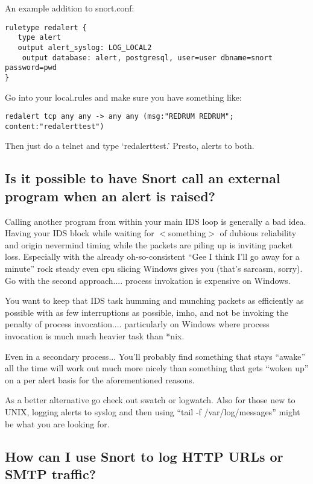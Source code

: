 \documentclass{article}
\begin{document}
An example addition to snort.conf:
\begin{verbatim}
ruletype redalert {
   type alert
   output alert_syslog: LOG_LOCAL2
    output database: alert, postgresql, user=user dbname=snort password=pwd
}
\end{verbatim}

Go into your local.rules and make sure you have something like:

\begin{verbatim}
redalert tcp any any -> any any (msg:"REDRUM REDRUM"; content:"redalerttest")
\end{verbatim}

Then just do a telnet and type `redalerttest.'  Presto, alerts to both.

\subsection{Is it possible to have Snort call an external program when an alert is raised?}

Calling another program from within your main IDS loop is
generally a bad idea.  Having your IDS block while waiting
for $<$something$>$ of dubious reliability and origin nevermind
timing while the packets are piling up is inviting packet loss.
Especially with the already oh-so-consistent ``Gee I think
I'll go away for a minute'' rock steady even cpu slicing
Windows gives you (that's sarcasm, sorry). Go  with the
second approach.... process invokation is expensive on 
Windows.

You want to keep that IDS task humming and munching
packets as efficiently as possible with as few interruptions
as possible, imho, and not be invoking the penalty of
process invocation.... particularly on Windows where
process invocation is much much heavier task than *nix.

Even in a secondary process... You'll probably find
something that stays ``awake'' all the time will work out
much more nicely than something that gets ``woken up''
on a per alert basis for the aforementioned reasons.
  
As a better alternative go check out swatch or logwatch.
Also for those new to UNIX, logging alerts to syslog and then using 
``tail -f /var/log/messages'' might be what you are looking for.

\subsection{How can I use Snort to log HTTP URLs or SMTP traffic?}
\end{document}
